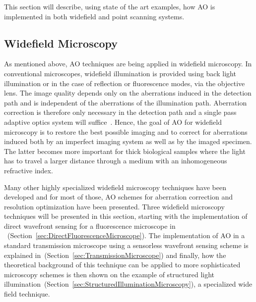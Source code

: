 This section will describe, using state of the art examples, how AO is implemented in both widefield and point scanning systems.  


\subsection{Widefield Microscopy}
\label{sec:WidefieldMicroscopy}

As mentioned above, AO techniques are being applied in widefield microscopy. In conventional microscopes, widefield illumination is provided using back light illumination or in the case of reflection or fluorescence modes, via the objective lens. The image quality depends only on the aberrations induced in the detection path and is independent of the aberrations of the illumination path. Aberration correction is therefore only necessary in the detection path and a single pass adaptive optics system will suffice~\cite{book_aberrations}. Hence, the goal of AO for widefield microscopy is to restore the best possible imaging and to correct for aberrations induced both by an imperfect imaging system as well as by the imaged specimen. The latter becomes more important for thick biological samples where the light has to travel a larger distance through a medium with an inhomogeneous refractive index. 

Many other highly specialized widefield microscopy techniques have been developed and for most of those, AO schemes for aberration correction and resolution optimization have been presented. Three widefield microscopy techniques will be presented in this section, starting with the implementation of direct wavefront sensing for a fluorescence microscope in ~(Section~\ref{sec:DirectFluorescenceMicroscope}). The implementation of AO in a standard transmission microscope using a sensorless wavefront sensing scheme is explained in~(Section~\ref{sec:TransmissionMicroscope}) and finally, how the theoretical background of this technique can be applied to more sophisticated microscopy schemes is then shown on the example of structured light illumination~(Section~\ref{sec:StructuredIlluminationMicroscopy}), a specialized wide field technique. 


